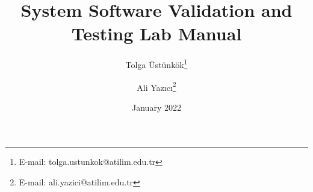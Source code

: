 \documentclass[paper=a4,fontsize=11,parskip=full,pagesize=auto,BCOR=5mm,DIV=12]{scrbook}
\begin{document}
    \titlehead{Atılım University\\Department of Software Engineering}
    \title{System Software Validation and Testing Lab Manual}
    \author{Tolga Üstünkök\thanks{E-mail: tolga.ustunkok@atilim.edu.tr} \and Ali Yazıcı\thanks{E-mail: ali.yazici@atilim.edu.tr}}
    \date{January 2022}
    \publishers{Department of Software Engineering\\Atılım University}
    \lowertitleback{This lab manual was set with the help of {\KOMAScript} and {\LaTeX} and last compiled on {\today}. The document source can be found in \url{https://github.com/tustunkok/se344-lab-manual}.}
    \maketitle
    
    \frontmatter
    \tableofcontents
    \listoffigures
    \listoftables
    \lstlistoflistings
    \listoftodos
    
    \mainmatter
    
    
    
    
    
    
    
    
    \appendix
    
    
    \backmatter
    \printbibliography[heading=bibintoc]
\end{document}

